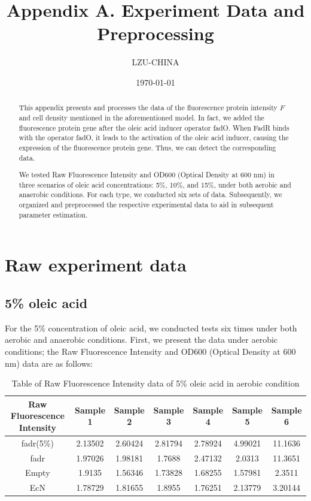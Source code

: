 \documentclass[UTF8]{article}
\title{Appendix A. Experiment Data and Preprocessing}
\author{LZU-CHINA}
\date{\today}
\begin{document}
    \maketitle
    \begin{abstract}
       This appendix presents and processes the data of the fluorescence protein intensity $F$ and cell density mentioned in the aforementioned model. In fact, we added the fluorescence protein gene after the oleic acid inducer operator fadO. When FadR binds with the operator fadO, it leads to the activation of the oleic acid inducer, causing the expression of the fluorescence protein gene. Thus, we can detect the corresponding data.
       
       We tested Raw Fluorescence Intensity and OD600 (Optical Density at 600 nm) in three scenarios of oleic acid concentrations: 5\%, 10\%, and 15\%, under both aerobic and anaerobic conditions. For each type, we conducted six sets of data. Subsequently, we organized and preprocessed the respective experimental data to aid in subsequent parameter estimation.
    \end{abstract}

\section{Raw experiment data}
\subsection{5\% oleic acid}
For the 5\% concentration of oleic acid, we conducted tests six times under both aerobic and anaerobic conditions. First, we present the data under aerobic conditions; the Raw Fluorescence Intensity and OD600 (Optical Density at 600 nm) data are as follows:

\begin{table}[h]
	\centering
	\begin{tabular}{|c|c|c|c|c|c|c|}
		\hline
		Raw Fluorescence Intensity & Sample 1 & Sample 2 & Sample 3 & Sample 4 & Sample 5 & Sample 6 \\ \hline
		fadr(5\%) & 2.13502 & 2.60424 & 2.81794 & 2.78924 & 4.99021 & 11.1636 \\ \hline
		fadr & 1.97026 & 1.98181 & 1.7688 & 2.47132 & 2.0313 & 11.3651 \\ \hline
		Empty & 1.9135 & 1.56346 & 1.73828 & 1.68255 & 1.57981 & 2.3511 \\ \hline
		EcN & 1.78729 & 1.81655 & 1.8955 & 1.76251 & 2.13779 & 3.20144 \\ \hline
	\end{tabular}
	\caption{Table of Raw Fluorescence Intensity data of 5\% oleic acid in aerobic condition}
\end{table}
\end{document}
